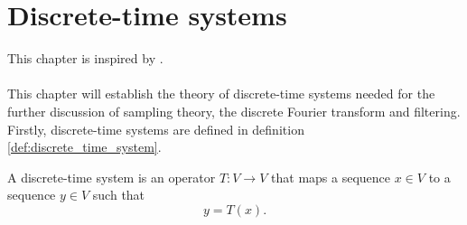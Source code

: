 \chapter{Discrete-time systems}\label{discrete_time_systems}
This chapter is inspired by \cite{FSP}.\\\\
This chapter will establish the theory of discrete-time systems needed for the further discussion of sampling theory, the discrete Fourier transform and filtering. Firstly, discrete-time systems are defined in definition \ref{def:discrete_time_system}.
\begin{definition}\label{def:discrete_time_system}
A discrete-time system is an operator $T:V\to V$ that maps a sequence $x\in V$ to a sequence $y\in V$ such that
\begin{equation}
y=T(x).
\end{equation}
\end{definition}
